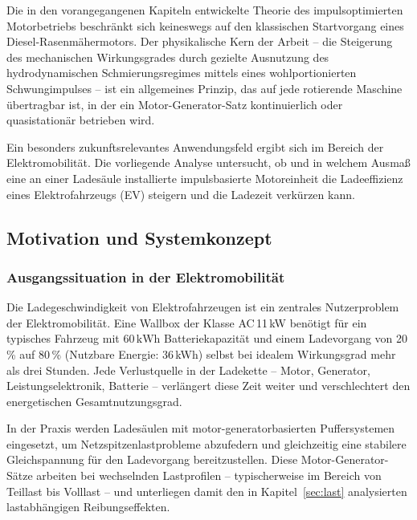 ﻿\documentclass[a4paper,12pt]{article}
\begin{document}
Die in den vorangegangenen Kapiteln entwickelte Theorie des impulsoptimierten
Motorbetriebs beschränkt sich keineswegs auf den klassischen Startvorgang eines
Diesel-Rasenmähermotors. Der physikalische Kern der Arbeit -- die Steigerung
des mechanischen Wirkungsgrades durch gezielte Ausnutzung des hydrodynamischen
Schmierungsregimes mittels eines wohlportionierten Schwungimpulses -- ist ein
allgemeines Prinzip, das auf jede rotierende Maschine übertragbar ist,
in der ein Motor-Generator-Satz kontinuierlich oder quasistationär betrieben wird.

Ein besonders zukunftsrelevantes Anwendungsfeld ergibt sich im Bereich der
Elektromobilität. Die vorliegende Analyse untersucht, ob und in welchem Ausmaß
eine an einer Ladesäule installierte impulsbasierte Motoreinheit die
Ladeeffizienz eines Elektrofahrzeugs (EV) steigern und die Ladezeit verkürzen kann.

\subsection{Motivation und Systemkonzept}

\subsubsection{Ausgangssituation in der Elektromobilität}

Die Ladegeschwindigkeit von Elektrofahrzeugen ist ein zentrales Nutzerproblem
der Elektromobilität. Eine Wallbox der Klasse AC\,11\,kW benötigt für ein
typisches Fahrzeug mit $60\,\text{kWh}$ Batteriekapazität und einem
Ladevorgang von 20\,\% auf 80\,\% (Nutzbare Energie: 36\,kWh) selbst bei
idealem Wirkungsgrad mehr als drei Stunden. Jede Verlustquelle in der
Ladekette -- Motor, Generator, Leistungselektronik, Batterie -- verlängert
diese Zeit weiter und verschlechtert den energetischen Gesamtnutzungsgrad.

In der Praxis werden Ladesäulen mit motor-generatorbasierten Puffersystemen
eingesetzt, um Netzspitzenlastprobleme abzufedern und gleichzeitig
eine stabilere Gleichspannung für den Ladevorgang bereitzustellen.
Diese Motor-Generator-Sätze arbeiten bei wechselnden Lastprofilen
-- typischerweise im Bereich von Teillast bis Volllast --
und unterliegen damit den in Kapitel~\ref{sec:last} analysierten
lastabhängigen Reibungseffekten.
\end{document}
